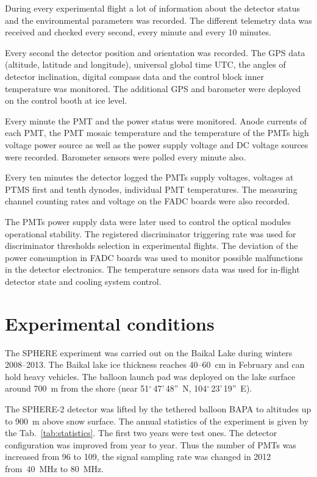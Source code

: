 \documentclass[final,5p,times,twocolumn]{elsarticle}
\begin{document}
During every experimental flight a lot of information about the detector status and the environmental parameters was recorded. The different telemetry data was received and checked every second, every minute and every 10 minutes. 

Every second the detector position and orientation was recorded. The GPS data (altitude, latitude and longitude), universal global time UTC, the angles of detector inclination, digital compass data and the control block inner temperature was monitored. The additional GPS and barometer were deployed on the control booth at ice level.

Every minute the PMT and the power status were monitored. Anode currents of each PMT, the PMT mosaic temperature and the temperature of the PMTs high voltage power source as well as the power supply voltage and DC voltage sources were recorded. Barometer sensors were polled every minute also.

Every ten minutes the detector logged the PMTs supply voltages, voltages at PTMS first and tenth dynodes, individual PMT temperatures. The measuring channel counting rates and voltage on the FADC boards were also recorded.

The PMTs power supply data were later used to control the optical modules operational stability. The registered discriminator triggering rate was used for discriminator thresholds selection in experimental flights. The deviation of the power consumption in FADC boards was used to monitor possible malfunctions in the detector electronics. The temperature sensors data was used for in-flight detector state and cooling system control.

\section{Experimental conditions}
\label{sect:data}
 
The SPHERE experiment was carried out on the Baikal Lake during winters 2008--2013. The Baikal lake ice thickness reaches 40--60~cm in February and can hold heavy vehicles. The balloon launch pad was deployed on the lake surface around 700~m from the shore (near 51$^\circ$\,47'\,48''~N, 104$^\circ$\,23'\,19''~E).

The \mbox{SPHERE-2} detector was lifted by the tethered balloon BAPA to altitudes up to 900~m above snow surface. The annual statistics of the experiment is given by the Tab.~\ref{tab:statistics}. The first two years were test ones. The detector configuration was improved from year to year. Thus the number of PMTs was increased from 96 to 109, the signal sampling rate was changed in 2012 from~40~MHz to 80~MHz.
\end{document}
